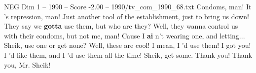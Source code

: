 \begin{textsample}{NEG Dim 1 – 1990 – Score -2.00 – 1990/tv\_com\_1990\_68.txt}  \label{ex:f1_neg_042}
Condoms, man!
It 's repression, man!
Just another tool of the establishment, just to bring us down!
They say we \textbf{gotta} use them, but who are they?
Well, they wanna control us with their condoms, but not me, man!
Cause I \textbf{ai} n't wearing one, and letting...
Sheik, use one or get none?
Well, these are cool!
I mean, I 'd use them!
I got you!
I 'd like them, and I 'd use them all the time!
Sheik, get some.
Thank you!
Thank you, Mr.
Sheik!

\end{textsample}
